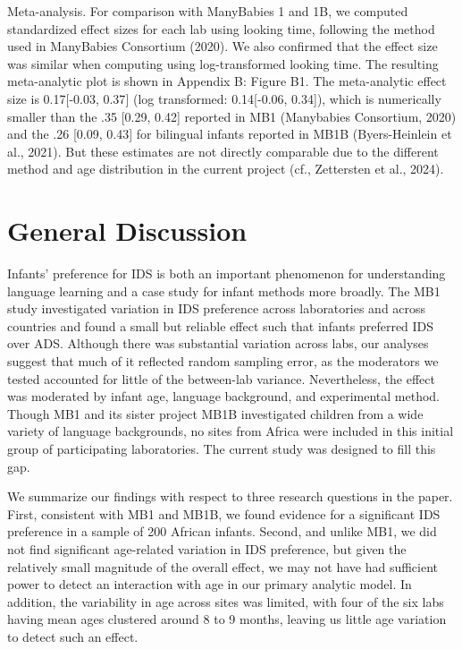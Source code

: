 \documentclass[
  english,
  ,man,floatsintext]{apa6}
\begin{document}
Meta-analysis. For comparison with ManyBabies 1 and 1B, we computed standardized effect sizes for each lab using looking time, following the method used in ManyBabies Consortium (2020). We also confirmed that the effect size was similar when computing using log-transformed looking time. The resulting meta-analytic plot is shown in Appendix B: Figure B1. The meta-analytic effect size is 0.17{[}-0.03, 0.37{]} (log transformed: 0.14{[}-0.06, 0.34{]}), which is numerically smaller than the .35 {[}0.29, 0.42{]} reported in MB1 (Manybabies Consortium, 2020) and the .26 {[}0.09, 0.43{]} for bilingual infants reported in MB1B (Byers-Heinlein et al., 2021). But these estimates are not directly comparable due to the different method and age distribution in the current project (cf., Zettersten et al., 2024).

\section{General Discussion}\label{general-discussion}

Infants' preference for IDS is both an important phenomenon for understanding language learning and a case study for infant methods more broadly. The MB1 study investigated variation in IDS preference across laboratories and across countries and found a small but reliable effect such that infants preferred IDS over ADS. Although there was substantial variation across labs, our analyses suggest that much of it reflected random sampling error, as the moderators we tested accounted for little of the between-lab variance. Nevertheless, the effect was moderated by infant age, language background, and experimental method. Though MB1 and its sister project MB1B investigated children from a wide variety of language backgrounds, no sites from Africa were included in this initial group of participating laboratories. The current study was designed to fill this gap.

We summarize our findings with respect to three research questions in the paper. First, consistent with MB1 and MB1B, we found evidence for a significant IDS preference in a sample of 200 African infants. Second, and unlike MB1, we did not find significant age-related variation in IDS preference, but given the relatively small magnitude of the overall effect, we may not have had sufficient power to detect an interaction with age in our primary analytic model. In addition, the variability in age across sites was limited, with four of the six labs having mean ages clustered around 8 to 9 months, leaving us little age variation to detect such an effect.
\end{document}
